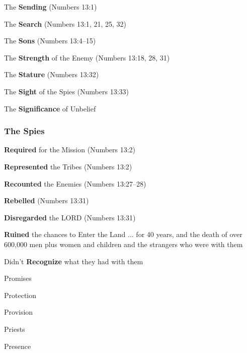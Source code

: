 \begin{compactenum}[I.]
   \item The \textbf{Sending}      (Numbers 13:1) 
   \item The \textbf{Search}       (Numbers 13:1, 21, 25, 32) 
   \item The \textbf{Sons}      (Numbers 13:4--15) 
    \item The \textbf{Strength} of the Enemy    (Numbers 13:18, 28, 31) 
   \item The \textbf{Stature}      (Numbers 13:32) 
   \item The \textbf{Sight}  of the Spies     (Numbers 13:33) 
  \item The \textbf{Significance} of Unbelief %
\end{compactenum}


\subsubsection{The Spies}

\begin{compactenum}[I.]
   \item \textbf{Required} for the Mission     (Numbers 13:2) 
   \item \textbf{Represented} the Tribes     (Numbers 13:2) 
   \item \textbf{Recounted} the Enemies    (Numbers 13:27--28)
   \item \textbf{Rebelled}      (Numbers 13:31)
   \item \textbf{Disregarded} the LORD     (Numbers 13:31)
   \item \textbf{Ruined} the chances to Enter the Land  ... for 40 years, and the death of over 600,000 men plus women and children and the strangers who were with them
   \item Didn't \textbf{Recognize} what they had with them
	\begin{compactenum}[A.]
		\item Promises
		\item Protection
		\item Provision
		\item Priests
		\item Presence
	\end{compactenum}
\end{compactenum}


